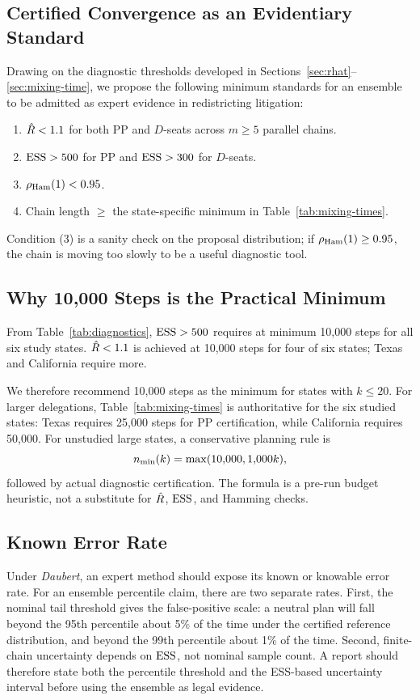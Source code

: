 \subsection{Certified Convergence as an Evidentiary Standard}

Drawing on the diagnostic thresholds developed in Sections~\ref{sec:rhat}--\ref{sec:mixing-time},
we propose the following minimum standards for an ensemble to be admitted
as expert evidence in redistricting litigation:

\begin{enumerate}
\item $\hat{R} < 1.1$ for both PP and $D$-seats across $m \geq 5$ parallel chains.
\item $\mathrm{ESS} > 500$ for PP and $\mathrm{ESS} > 300$ for $D$-seats.
\item $\rho_{\mathrm{Ham}}(1) < 0.95$.
\item Chain length $\geq$ the state-specific minimum in Table~\ref{tab:mixing-times}.
\end{enumerate}

Condition (3) is a sanity check on the proposal distribution; if
$\rho_{\mathrm{Ham}}(1) \geq 0.95$, the chain is moving too slowly to be a useful
diagnostic tool.

\subsection{Why 10{,}000 Steps is the Practical Minimum}

From Table~\ref{tab:diagnostics}, $\mathrm{ESS} > 500$ requires at minimum
10{,}000 steps for all six study states.
$\hat{R} < 1.1$ is achieved at 10{,}000 steps for four of six states;
Texas and California require more.

We therefore recommend 10{,}000 steps as the minimum for states with
$k \leq 20$. For larger delegations, Table~\ref{tab:mixing-times} is
authoritative for the six studied states: Texas requires 25{,}000 steps for
PP certification, while California requires 50{,}000. For unstudied large
states, a conservative planning rule is
\[
  n_{\rm min}(k) = \max(10{,}000, 1{,}000k),
\]
followed by actual diagnostic certification. The formula is a pre-run budget
heuristic, not a substitute for $\hat{R}$, $\mathrm{ESS}$, and Hamming checks.

\subsection{Known Error Rate}

Under \textit{Daubert}, an expert method should expose its known or knowable
error rate. For an ensemble percentile claim, there are two separate rates.
First, the nominal tail threshold gives the false-positive scale: a neutral
plan will fall beyond the 95th percentile about 5\% of the time under the
certified reference distribution, and beyond the 99th percentile about 1\% of
the time. Second, finite-chain uncertainty depends on $\mathrm{ESS}$, not nominal
sample count. A report should therefore state both the percentile threshold and
the ESS-based uncertainty interval before using the ensemble as legal evidence.

